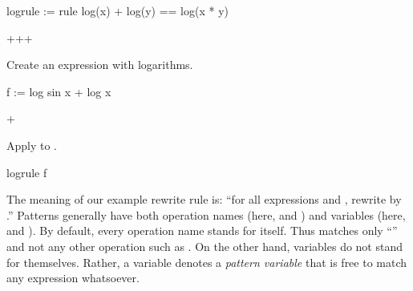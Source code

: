 \begin{xtc}
\begin{spadsrc}
logrule := rule log(x) + log(y) == log(x * y) 
\end{spadsrc}
\begin{TeXOutput}
\begin{fricasmath}{1}
++\SYMBOL{\ ==\ }+%
\end{fricasmath}
\end{TeXOutput}
\end{xtc}
\begin{xtc}
\begin{xtccomment}
Create an expression with logarithms.
\end{xtccomment}
\begin{spadsrc}
f := log sin x + log x 
\end{spadsrc}
\begin{TeXOutput}
\begin{fricasmath}{2}
+%
\end{fricasmath}
\end{TeXOutput}
\end{xtc}
\begin{xtc}
\begin{xtccomment}
Apply  to .
\end{xtccomment}
\begin{spadsrc}
logrule f 
\end{spadsrc}
\begin{TeXOutput}
\begin{fricasmath}{3}
%
\end{fricasmath}
\end{TeXOutput}
\end{xtc}

The meaning of our example rewrite rule is:
``for all expressions  and , rewrite
 by .''
Patterns generally have both operation names
(here,  and \spadop{+})
and variables (here,  and ).
By default, every operation name stands for itself.
Thus   matches only ``'' and not any
other operation such as .
On the other hand, variables do not stand for themselves.
Rather, a variable denotes a
{\it pattern variable} that is free to match any expression whatsoever.


